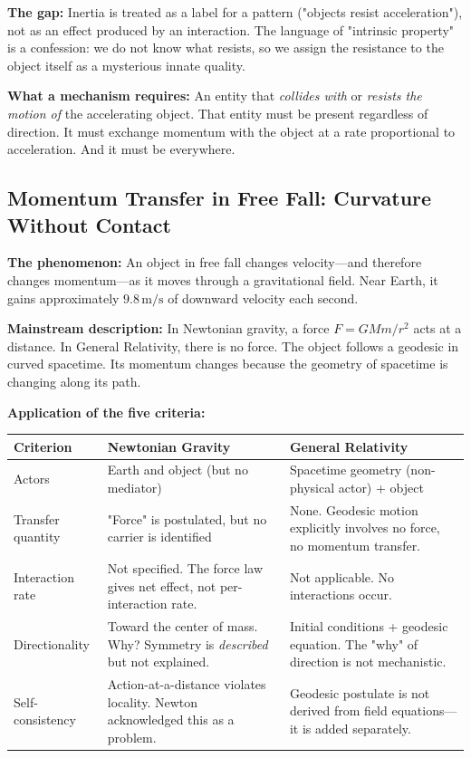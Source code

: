 \documentclass[12pt, a4paper]{article}
\begin{document}
\textbf{The gap:} Inertia is treated as a label for a pattern ("objects resist acceleration"), not as an effect produced by an interaction. The language of "intrinsic property" is a confession: we do not know what resists, so we assign the resistance to the object itself as a mysterious innate quality.

\textbf{What a mechanism requires:} An entity that \textit{collides with} or \textit{resists the motion of} the accelerating object. That entity must be present regardless of direction. It must exchange momentum with the object at a rate proportional to acceleration. And it must be everywhere.

\subsection{Momentum Transfer in Free Fall: Curvature Without Contact}
\label{subsec:freefall_gap}

\textbf{The phenomenon:} An object in free fall changes velocity—and therefore changes momentum—as it moves through a gravitational field. Near Earth, it gains approximately \( 9.8 \, \text{m/s} \) of downward velocity each second.

\textbf{Mainstream description:} In Newtonian gravity, a force \( F = GMm/r^2 \) acts at a distance. In General Relativity, there is no force. The object follows a geodesic in curved spacetime. Its momentum changes because the geometry of spacetime is changing along its path.

\textbf{Application of the five criteria:}

\begin{center}
\begin{tabular}{|p{3cm}|p{5cm}|p{5cm}|}
\hline
\textbf{Criterion} & \textbf{Newtonian Gravity} & \textbf{General Relativity} \\
\hline
Actors & Earth and object (but no mediator) & Spacetime geometry (non-physical actor) + object \\
\hline
Transfer quantity & "Force" is postulated, but no carrier is identified & None. Geodesic motion explicitly involves no force, no momentum transfer. \\
\hline
Interaction rate & Not specified. The force law gives net effect, not per-interaction rate. & Not applicable. No interactions occur. \\
\hline
Directionality & Toward the center of mass. Why? Symmetry is \textit{described} but not explained. & Initial conditions + geodesic equation. The "why" of direction is not mechanistic. \\
\hline
Self-consistency & Action-at-a-distance violates locality. Newton acknowledged this as a problem. & Geodesic postulate is not derived from field equations—it is added separately. \\
\hline
\end{tabular}
\end{center}
\end{document}
